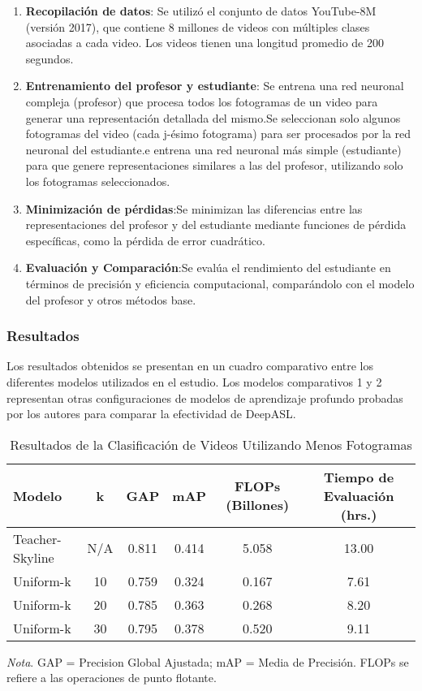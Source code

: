 \begin{enumerate}
	\item \textbf{Recopilación de datos}: Se utilizó el conjunto de datos YouTube-8M (versión 2017), que contiene 8 millones de videos con múltiples clases asociadas a cada video. Los videos tienen una longitud promedio de 200 segundos.
	\item \textbf{Entrenamiento del profesor y estudiante}:  Se entrena una red neuronal compleja (profesor) que procesa todos los fotogramas de un video para generar una representación detallada del mismo.Se seleccionan solo algunos fotogramas del video (cada j-ésimo fotograma) para ser procesados por la red neuronal del estudiante.e entrena una red neuronal más simple (estudiante) para que genere representaciones similares a las del profesor, utilizando solo los fotogramas seleccionados.
	\item \textbf{Minimización de pérdidas}:Se minimizan las diferencias entre las representaciones del profesor y del estudiante mediante funciones de pérdida específicas, como la pérdida de error cuadrático.
	\item \textbf{Evaluación y Comparación}:Se evalúa el rendimiento del estudiante en términos de precisión y eficiencia computacional, comparándolo con el modelo del profesor y otros métodos base.
\end{enumerate}


\subsubsection{Resultados}

Los resultados obtenidos se presentan en un cuadro comparativo entre los diferentes modelos utilizados en el estudio. Los modelos comparativos 1 y 2 representan otras configuraciones de modelos de aprendizaje profundo probadas por los autores para comparar la efectividad de DeepASL.
\begin{table}[h]
    \centering
    \caption{Resultados de la Clasificación de Videos Utilizando Menos Fotogramas}
    \begin{tabular}{lccccc}
        \hline
        \textbf{Modelo} & \textbf{k} & \textbf{GAP} & \textbf{mAP} & \textbf{FLOPs (Billones)} & \textbf{Tiempo de Evaluación (hrs.)} \\
        \hline
        Teacher-Skyline & N/A  & 0.811 & 0.414 & 5.058 & 13.00 \\
        Uniform-k       & 10   & 0.759 & 0.324 & 0.167 & 7.61  \\
        Uniform-k       & 20   & 0.785 & 0.363 & 0.268 & 8.20  \\
        Uniform-k       & 30   & 0.795 & 0.378 & 0.520 & 9.11  \\
        \hline
    \end{tabular}
    \label{table:video_classification}
    \begin{flushleft}
    \textit{Nota}. GAP = Precision Global Ajustada; mAP = Media de Precisión. FLOPs se refiere a las operaciones de punto flotante.
    \end{flushleft}
\end{table}



